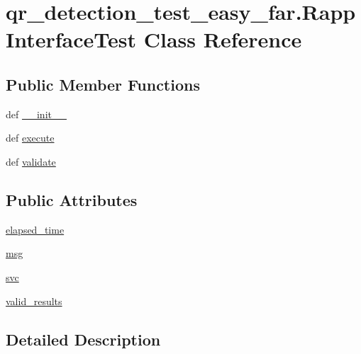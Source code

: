 \hypertarget{classqr__detection__test__easy__far_1_1RappInterfaceTest}{\section{qr\-\_\-detection\-\_\-test\-\_\-easy\-\_\-far.\-Rapp\-Interface\-Test Class Reference}
\label{classqr__detection__test__easy__far_1_1RappInterfaceTest}
}
\subsection*{Public Member Functions}
\begin{DoxyCompactItemize}
\item 
def \hyperlink{classqr__detection__test__easy__far_1_1RappInterfaceTest_a81f5743944a1db8cf7ecbd88cc01923b}{\-\_\-\-\_\-init\-\_\-\-\_\-}
\item 
def \hyperlink{classqr__detection__test__easy__far_1_1RappInterfaceTest_acf636420fcbae6b0c1b5d00f6fd2d4c1}{execute}
\item 
def \hyperlink{classqr__detection__test__easy__far_1_1RappInterfaceTest_abc93831c8e255bddfbae9c30f97c165c}{validate}
\end{DoxyCompactItemize}
\subsection*{Public Attributes}
\begin{DoxyCompactItemize}
\item 
\hyperlink{classqr__detection__test__easy__far_1_1RappInterfaceTest_ad8244cb14e4a8d6b13d50f8d2e806dc2}{elapsed\-\_\-time}
\item 
\hyperlink{classqr__detection__test__easy__far_1_1RappInterfaceTest_aada2da80874de337afb9bf02eac0182c}{msg}
\item 
\hyperlink{classqr__detection__test__easy__far_1_1RappInterfaceTest_ab8c0b2d9d8068a62b5e470f63195ec5d}{svc}
\item 
\hyperlink{classqr__detection__test__easy__far_1_1RappInterfaceTest_ac2980ccae8d608d700453daf03ef8705}{valid\-\_\-results}
\end{DoxyCompactItemize}


\subsection{Detailed Description}



